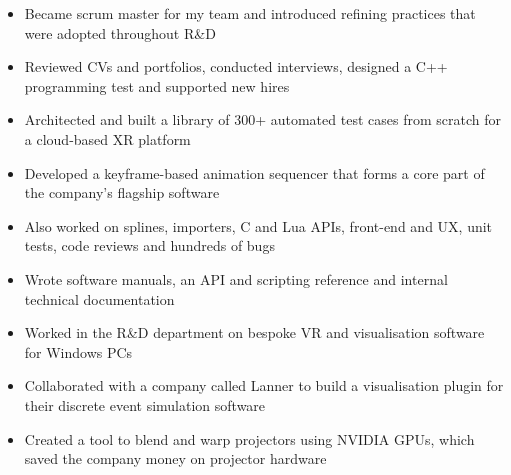 \documentclass[10pt,a4paper,ragged2e,withhyper]{altacv}
\begin{document}

\makecvheader


\begin{paracol}{2}


\begin{itemize}
\item Became scrum master for my team and introduced refining practices that were adopted throughout R\&D
\item Reviewed CVs and portfolios, conducted interviews, designed a C++ programming test and supported new hires
\item Architected and built a library of 300+ automated test cases from scratch for a cloud-based XR platform
\end{itemize}
\medskip
{}      

\divider

\begin{itemize}
\item Developed a keyframe-based animation sequencer that forms a core part of the company's flagship software
\item Also worked on splines, importers, C and Lua APIs, front-end and UX, unit tests, code reviews and hundreds of bugs
\item Wrote software manuals, an API and scripting reference and internal technical documentation
\end{itemize}
\medskip
{}      

\divider

\begin{itemize}
\item Worked in the R\&D department on bespoke VR and visualisation software for Windows PCs
\item Collaborated with a company called Lanner to build a visualisation plugin for their discrete event simulation software
\item Created a tool to blend and warp projectors using NVIDIA GPUs, which saved the company money on projector hardware
\end{itemize}
\medskip
{}      


\end{paracol}
\end{document}
